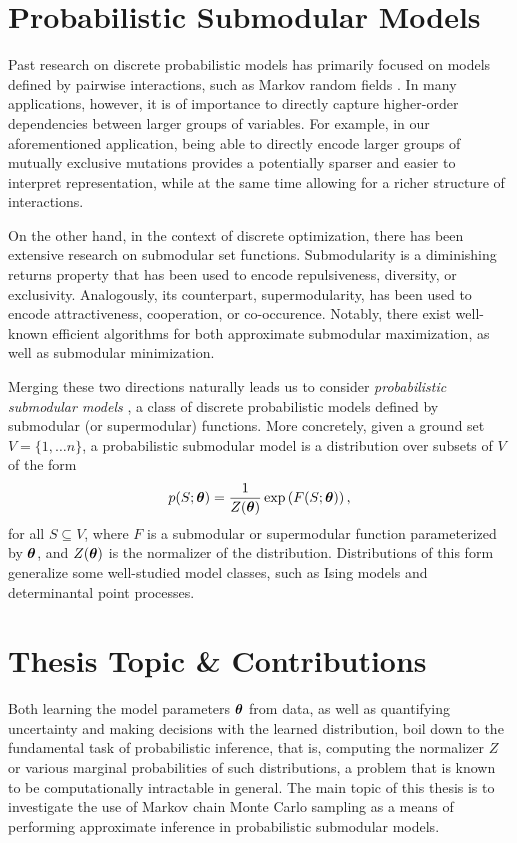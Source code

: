 \section{Probabilistic Submodular Models}
Past research on discrete probabilistic models has primarily focused on models defined by pairwise interactions, such as Markov random fields \citep{koller09}.
In many applications, however, it is of importance to directly capture higher-order dependencies between larger groups of variables.
For example, in our aforementioned application, being able to directly encode larger groups of mutually exclusive mutations provides a potentially sparser and easier to interpret representation, while at the same time allowing for a richer structure of interactions.

On the other hand, in the context of discrete optimization, there has been extensive research on submodular set functions.
Submodularity is a diminishing returns property that has been used to encode repulsiveness, diversity, or exclusivity.
Analogously, its counterpart, supermodularity, has been used to encode attractiveness, cooperation, or co-occurence.
Notably, there exist well-known efficient algorithms for both approximate submodular maximization, as well as submodular minimization.

Merging these two directions naturally leads us to consider \emph{probabilistic submodular models} \citep{djolonga14,gotovos15}, a class of discrete probabilistic models defined by submodular (or supermodular) functions.
More concretely, given a ground set $V = \{1,\ldots n\}$, a probabilistic submodular model is a distribution over subsets of $V$ of the form
\begin{align*}
p(S; \bm{\theta}) = \frac{1}{Z(\bm{\theta})} \exp\left( F(S; \bm{\theta}) \right),
\end{align*}
for all $S \subseteq V$, where $F$ is a submodular or supermodular function parameterized by $\bm{\theta}$, and $Z(\bm{\theta})$ is the normalizer of the distribution.
Distributions of this form generalize some well-studied model classes, such as Ising models and determinantal point processes.

\section{Thesis Topic \& Contributions}
Both learning the model parameters $\bm{\theta}$ from data, as well as quantifying uncertainty and making decisions with the learned distribution, boil down to the fundamental task of probabilistic inference, that is, computing the normalizer $Z$ or various marginal probabilities of such distributions, a problem that is known to be computationally intractable in general.
The main topic of this thesis is to investigate the use of Markov chain Monte Carlo sampling as a means of performing approximate inference in probabilistic submodular models.

